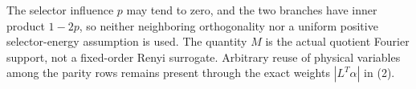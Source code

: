 The selector influence $p$ may tend to zero, and the two branches
have inner product $1-2p$, so neither neighboring orthogonality nor a
uniform positive selector-energy assumption is used.  The quantity
$M$ is the actual quotient Fourier support, not a fixed-order Renyi
surrogate.  Arbitrary reuse of physical variables among the parity
rows remains present through the exact weights $|L^T\alpha|$ in (2).
